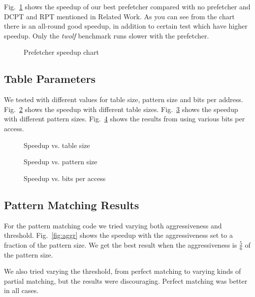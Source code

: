 Fig.~\ref{fig:prefetcher_speedup} shows the speedup of our best prefetcher
compared with no prefetcher and DCPT and RPT mentioned in Related Work.
As you can see from the
chart there is an all-round good speedup, in addition to certain test which
have higher speedup. Only the \emph{twolf} benchmark runs slower with the
prefetcher.

\begin{figure}
	
	\caption{Prefetcher speedup chart}
	\label{fig:prefetcher_speedup}
\end{figure}

\subsection{Table Parameters}
We tested with different values for table size, pattern size and bits per address.
Fig.~\ref{fig:table_size_chart} shows the speedup with different table sizes.
Fig.~\ref{fig:pattern_size} shows the speedup with different pattern sizes.
Fig.~\ref{fig:bits} shows the results from using various bits per access.

\begin{figure}
	
	\caption{Speedup vs. table size}
	\label{fig:table_size_chart}
\end{figure}

\begin{figure}
	
	\caption{Speedup vs. pattern size}
	\label{fig:pattern_size}
\end{figure}

\begin{figure}
	
	\caption{Speedup vs. bits per access}
	\label{fig:bits}
\end{figure}

\subsection{Pattern Matching Results}
For the pattern matching code we tried varying both aggressiveness and
threshold. Fig.~\ref{fig:aggr} shows the speedup with the aggressiveness set to
a fraction of the pattern size. We get the best result when the aggressiveness
is $\frac{5}{6}$ of the pattern size.

We also tried varying the threshold, from perfect matching to varying kinds of
partial matching, but the results were discouraging. Perfect matching was
better in all cases.

